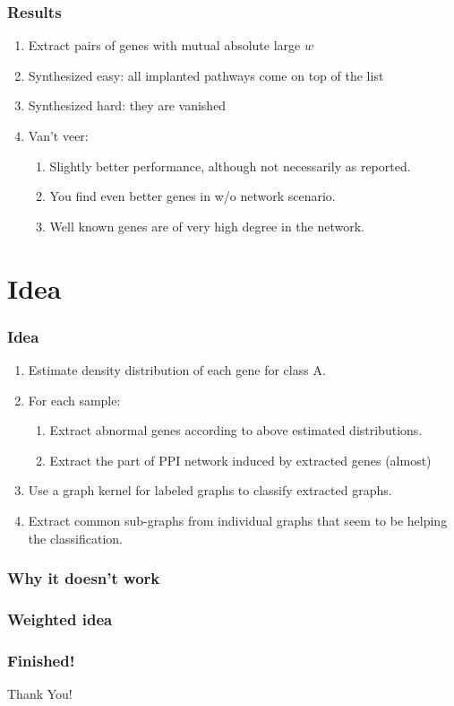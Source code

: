 \documentclass{beamer}
\begin{document}
\begin{frame}
\frametitle{Results}
\begin{enumerate}
\item Extract pairs of genes with mutual absolute large $w$ 
\item Synthesized easy: all implanted pathways come on top of the list 
\item Synthesized hard: they are vanished \pause
\item Van't veer: 
  \begin{enumerate}
    \item Slightly better performance, although not necessarily as reported.
    \item You find even better genes in w/o network scenario.
    \item Well known genes are of very high degree in the network.
  \end{enumerate}
\end{enumerate}
\end{frame}

\section{Idea}
\begin{frame}
\frametitle{Idea}
\begin{enumerate}
\item Estimate density distribution of each gene for class A. \pause
\item For each sample:
  \begin{enumerate}
  \item Extract abnormal genes according to above estimated distributions.
  \item Extract the part of PPI network induced by extracted genes (almost)
  \end{enumerate}\pause
\item Use a graph kernel for labeled graphs to classify extracted graphs. \pause
\item Extract common sub-graphs from individual graphs that seem to be helping the classification.
\end{enumerate}
\end{frame}

\begin{frame}
  \frametitle{Why it doesn't work}
\end{frame}

\begin{frame}
  \frametitle{Weighted idea}
\end{frame}

\begin{frame}[plain]
\frametitle{Finished!}
  \begin{center}
    \Huge{Thank You!}
  \end{center}
\end{frame}
\end{document}

